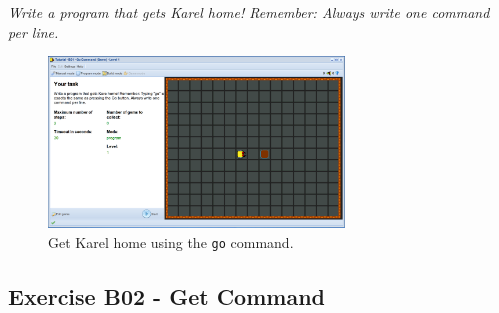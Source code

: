 \documentclass[article,A4,12pt]{llncs}
\begin{document}
{\em Write a program that gets Karel home! Remember: Always write one command per line.}

\begin{figure}[!ht]
\begin{center}
\includegraphics[width=0.7\textwidth]{img/b01.png}
\end{center}
\vspace{-4mm}
\caption{Get Karel home using the {\tt go} command.}
\label{fig:b01}
\vspace{-4mm}
\end{figure}
\noindent

\subsection{Exercise B02 - Get Command}
\end{document}
